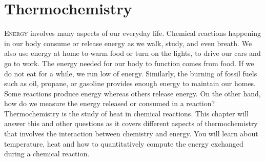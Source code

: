 \documentclass[main.tex]{subfiles}
\begin{document}
\linenumbers



\chapter[Thermochemistry]{Thermochemistry}
\label{ch:energy}


   
   \begin{marginfigure}
\end{marginfigure}




\lettrine[lines=4]{\color{black!45}E}{nergy}  involves many aspects of our everyday life. Chemical reactions happening in our body consume or release energy as we walk, study, and even breath. We also use energy at home to warm food or turn on the lights, to drive our cars and go to work. The energy needed for our body to function comes from food. If we do not eat for a while, we run low of energy. Similarly, the burning of fossil fuels such as oil, propane, or gasoline provides enough energy to maintain our homes. Some reactions produce energy whereas others release energy. On the other hand, how do we measure the energy released or consumed in a reaction? Thermochemistry is the study of heat in chemical reactions. This chapter will answer this and other questions as it covers different aspects of thermochemistry that involves the interaction between chemistry and energy. You will learn about temperature, heat and how to quantitatively compute the energy exchanged during a chemical reaction.
\end{document}
